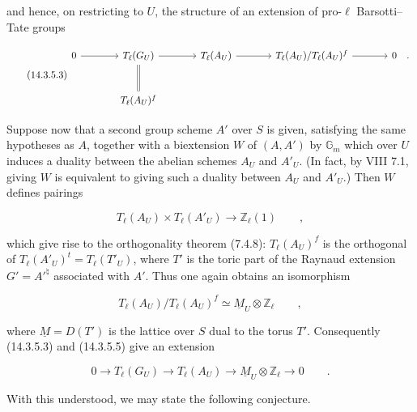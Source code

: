 \noindent
and hence, on restricting to $U$, the structure of an extension of
pro-$\ell$ Barsotti--Tate groups

\begin{equation}\tag{14.3.5.3}
\begin{tikzcd}[row sep=large,column sep=large]
0 \arrow[r] & T_\ell(G_U) \arrow[r] \arrow[d,equal]
 & T_\ell(A_U) \arrow[r]
 & T_\ell(A_U)/T_\ell(A_U)^f \arrow[r] & 0\quad .\\
& T_\ell(A_U)^f
\end{tikzcd}
\end{equation}

Suppose now that a second group scheme $A'$ over $S$ is given,
satisfying the same hypotheses as $A$, together with a biextension $W$
of $(A,A')$ by $\mathbb G_m$ which over $U$ induces a duality between
the abelian schemes $A_U$ and $A'_U$.  (In fact, by VIII 7.1, giving
$W$ is equivalent to giving such a duality between $A_U$ and $A'_U$.)
Then $W$ defines pairings

\begin{equation}\tag{14.3.5.4}
 T_\ell(A_U)\times T_\ell(A'_U)\longrightarrow\mathbb Z_\ell(1)
 \qquad ,
\end{equation}

\noindent
which give rise to the orthogonality theorem (7.4.8):
$T_\ell(A_U)^f$ is the orthogonal of
$T_\ell(A'_U)^t=T_\ell(T'_U)$, where $T'$ is the toric part of the
Raynaud extension $G'={A'}^{\natural}$ associated with $A'$.  Thus one
again obtains an isomorphism

\begin{equation}\tag{14.3.5.5}
 T_\ell(A_U)/T_\ell(A_U)^f
 \simeq\underline M_U\otimes\mathbb Z_\ell\qquad ,
\end{equation}

\noindent
where $\underline M=D(T')$ is the lattice over $S$ dual to the torus
$T'$.  Consequently (14.3.5.3) and (14.3.5.5) give an extension

\begin{equation}\tag{14.3.5.6}
 0\longrightarrow T_\ell(G_U)\longrightarrow T_\ell(A_U)
 \longrightarrow\underline M_U\otimes\mathbb Z_\ell
 \longrightarrow0\qquad .
\end{equation}

With this understood, we may state the following conjecture.
